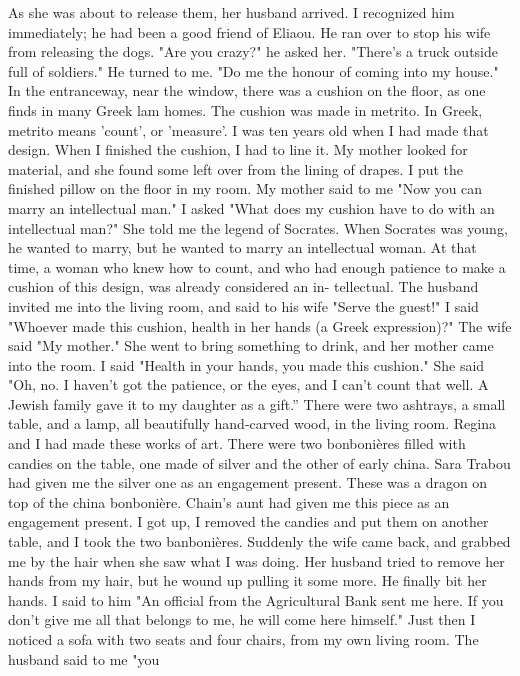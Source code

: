 As she was about to release them, her husband
arrived.
I recognized him immediately; he had been a good friend of Eliaou.
He ran over 
to stop his wife from releasing the dogs.
"Are you crazy?"
he asked her.
"There's a truck outside full of soldiers."
He 
turned to me.
"Do me the honour of coming into my house."
In the entranceway, near 
the window, there was a cushion on the floor, as one finds in many Greek lam homes.
The 
cushion was made in metrito.
In Greek, metrito means 'count', or 'measure'.
I was ten 
years old when I had made that design.
When I finished the cushion, I had to line it.
My 
mother looked for material, and she found some left over from the lining of drapes.
I 
put the finished pillow on the floor in my room.
My mother said to me "Now you can marry 
an intellectual man."
I asked "What does my cushion have to do with an intellectual man?"
She told me the legend of Socrates.
When Socrates was young, he wanted to marry, but he 
wanted to marry an intellectual woman.
At that time, a woman who knew how to count, and 
who had enough patience to make a cushion of this design, was already considered an in-
tellectual.
The husband invited me into the living room, and said to his wife "Serve the guest!"
I said "Whoever made this cushion, health in her hands (a Greek expression)?"
The wife 
said "My mother."
She went to bring something to drink, and her mother came into the 
room.
I said "Health in your hands, you made this cushion."
She said "Oh, no.
I haven't 
got the patience, or the eyes, and I can't count that well.
A Jewish family gave it to 
my daughter as a gift.”
There were two ashtrays, a small table, and a lamp, all beautifully hand-carved wood, 
in the living room.
Regina and I had made these works of art.
There were two bonbonières filled with candies on the table, one made of silver and the other of early china.
Sara Trabou had given me the silver one as an engagement present.
These was a dragon on 
top of the china bonbonière.
Chain's aunt had given me this piece as an engagement present.
I got up, I removed the candies and put them on another table, and I took the two 
banbonières.
Suddenly the wife came back, and grabbed me by the hair when she saw what 
I was doing.
Her husband tried to remove her hands from my hair, but he wound up pulling it some more.
He finally bit her hands.
I said to him "An official from the Agricultural Bank sent me here.
If you don't give me all that belongs to me, he will come here himself."
Just then I noticed a sofa with two seats and four chairs, from my own living room.
The husband said to me "you 
